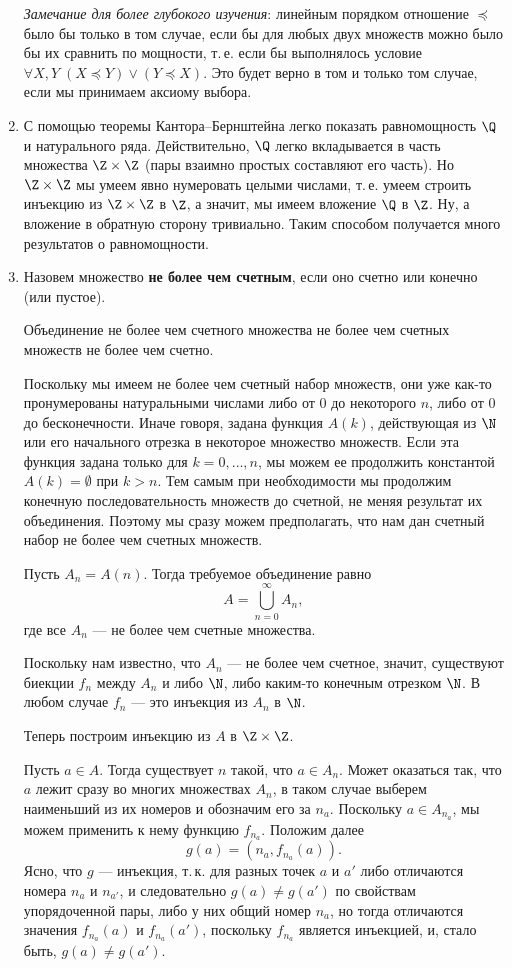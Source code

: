\begin{enumerate}
\textit{Замечание для более глубокого изучения}: линейным порядком отношение $\preccurlyeq$ было бы только в том случае, если бы для любых двух множеств можно было бы их сравнить по мощности, т.\,е. если бы выполнялось условие $\forall X,Y\;(X\preccurlyeq Y)\lor(Y\preccurlyeq X)$. Это будет верно в том и только том случае, если мы принимаем аксиому выбора.

\item С помощью теоремы Кантора--Бернштейна легко показать равномощность $\Q$ и натурального ряда. Действительно, $\Q$ легко вкладывается в часть множества $\Z\times \Z$ (пары взаимно простых составляют его часть). Но $\Z\times\Z$ мы умеем явно нумеровать целыми числами, т.\,е. умеем строить инъекцию из $\Z\times\Z$ в $\Z$, а значит, мы имеем вложение $\Q$ в $\Z$. Ну, а вложение в обратную сторону тривиально. Таким способом получается много результатов о равномощности.
\item Назовем множество \textbf{не более чем счетным}, если оно счетно или конечно (или пустое).
\begin{thrm}
Объединение не более чем счетного множества не более чем счетных множеств не более чем счетно.
\end{thrm}
\pf
Поскольку мы имеем не более чем счетный набор множеств, они уже как-то пронумерованы натуральными числами либо от 0 до некоторого $n$, либо от 0 до бесконечности. Иначе говоря, задана функция $A(k)$, действующая из $\N$ или его начального отрезка в некоторое множество множеств. Если эта функция задана только для $k=0,\dots,n$, мы можем ее продолжить константой $A(k)=\emptyset$ при $k>n$. Тем самым при необходимости мы продолжим конечную последовательность множеств до счетной, не меняя результат их объединения. Поэтому мы сразу можем предполагать, что нам дан счетный набор не более чем счетных множеств.

Пусть $A_n = A(n)$. Тогда требуемое объединение равно
$$
A = \bigcup_{n=0}^\infty A_n,
$$
где все $A_n$ --- не более чем счетные множества.

Поскольку нам известно, что $A_n$ --- не более чем счетное, значит, существуют биекции $f_n$ между $A_n$ и либо $\N$, либо каким-то конечным отрезком $\N$. В любом случае $f_n$ --- это инъекция из $A_n$ в $\N$.

Теперь построим инъекцию из $A$ в $\Z\times\Z$.

Пусть $a\in A$. Тогда существует $n$ такой, что $a\in A_n$. Может оказаться так, что $a$ лежит сразу во многих множествах $A_n$, в таком случае выберем наименьший из их номеров и обозначим его за $n_a$. Поскольку $a\in A_{n_a}$, мы можем применить к нему функцию $f_{n_a}$. Положим далее
$$
g(a) = (n_a,f_{n_a}(a)).
$$
Ясно, что $g$ --- инъекция, т.\,к. для разных точек $a$ и $a'$ либо отличаются номера $n_a$ и $n_{a'}$, и следовательно $g(a)\ne g(a')$ по свойствам упорядоченной пары, либо у них общий номер $n_a$, но тогда отличаются значения $f_{n_a}(a)$ и $f_{n_a}(a')$, поскольку $f_{n_a}$ является инъекцией, и, стало быть, $g(a)\ne g(a')$.


\end{enumerate}
